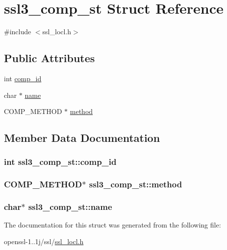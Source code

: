 \hypertarget{structssl3__comp__st}{\section{ssl3\-\_\-comp\-\_\-st Struct Reference}
\label{structssl3__comp__st}
}


{\ttfamily \#include $<$ssl\-\_\-locl.\-h$>$}

\subsection*{Public Attributes}
\begin{DoxyCompactItemize}
\item 
int \hyperlink{structssl3__comp__st_afaf62019237826d0a031bcc703b239a4}{comp\-\_\-id}
\item 
char $\ast$ \hyperlink{structssl3__comp__st_a56b15348afc821c80afac18a9447beb1}{name}
\item 
C\-O\-M\-P\-\_\-\-M\-E\-T\-H\-O\-D $\ast$ \hyperlink{structssl3__comp__st_a5a621c50f2c8deaf04f2c910a2973de3}{method}
\end{DoxyCompactItemize}


\subsection{Member Data Documentation}
\hypertarget{structssl3__comp__st_afaf62019237826d0a031bcc703b239a4}{
\subsubsection[{comp\-\_\-id}]{\setlength{\rightskip}{0pt plus 5cm}int ssl3\-\_\-comp\-\_\-st\-::comp\-\_\-id}}\label{structssl3__comp__st_afaf62019237826d0a031bcc703b239a4}
\hypertarget{structssl3__comp__st_a5a621c50f2c8deaf04f2c910a2973de3}{
\subsubsection[{method}]{\setlength{\rightskip}{0pt plus 5cm}C\-O\-M\-P\-\_\-\-M\-E\-T\-H\-O\-D$\ast$ ssl3\-\_\-comp\-\_\-st\-::method}}\label{structssl3__comp__st_a5a621c50f2c8deaf04f2c910a2973de3}
\hypertarget{structssl3__comp__st_a56b15348afc821c80afac18a9447beb1}{
\subsubsection[{name}]{\setlength{\rightskip}{0pt plus 5cm}char$\ast$ ssl3\-\_\-comp\-\_\-st\-::name}}\label{structssl3__comp__st_a56b15348afc821c80afac18a9447beb1}


The documentation for this struct was generated from the following file\-:\begin{DoxyCompactItemize}
\item 
openssl-\/1..\-1j/ssl/\hyperlink{ssl__locl_8h}{ssl\-\_\-locl.\-h}\end{DoxyCompactItemize}
